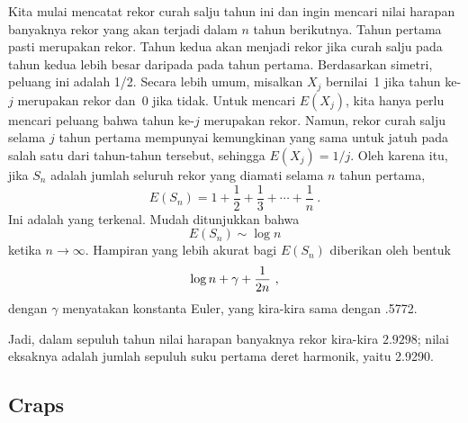 \begin{example}\label{exam 6.5} Kita mulai mencatat rekor curah salju tahun ini dan
ingin mencari nilai harapan banyaknya rekor yang akan terjadi dalam $n$ tahun
berikutnya. Tahun pertama pasti merupakan rekor. Tahun kedua akan menjadi rekor jika
curah salju pada tahun kedua lebih besar daripada pada tahun pertama. Berdasarkan
simetri, peluang ini adalah 1/2. Secara lebih umum, misalkan $X_j$ bernilai~1 jika
tahun ke-$j$ merupakan rekor dan~0 jika tidak. Untuk mencari $E(X_j)$, kita hanya
perlu mencari peluang bahwa tahun ke-$j$ merupakan rekor. Namun, rekor curah salju
selama $j$ tahun pertama mempunyai kemungkinan yang sama untuk jatuh pada salah satu
dari tahun-tahun tersebut, sehingga $E(X_j) = 1/j$. Oleh karena itu, jika $S_n$
adalah jumlah seluruh rekor yang diamati selama $n$ tahun pertama,
$$ E(S_n) = 1 + \frac 12 + \frac 13 +\cdots+ \frac 1n\ .
$$ Ini adalah  yang terkenal. Mudah ditunjukkan bahwa
$$ E(S_n) \sim \log n
$$ ketika $n \rightarrow \infty$. Hampiran yang lebih akurat bagi $E(S_n)$ diberikan
oleh bentuk
$$\log n + \gamma + {1\over {2n}}\ ,$$
dengan $\gamma$ menyatakan konstanta Euler, yang kira-kira sama dengan .5772.

Jadi, dalam sepuluh tahun nilai harapan banyaknya rekor kira-kira $2.9298$; nilai
eksaknya adalah jumlah sepuluh suku pertama deret harmonik, yaitu 2.9290.
\end{example}

\subsection*{Craps}

